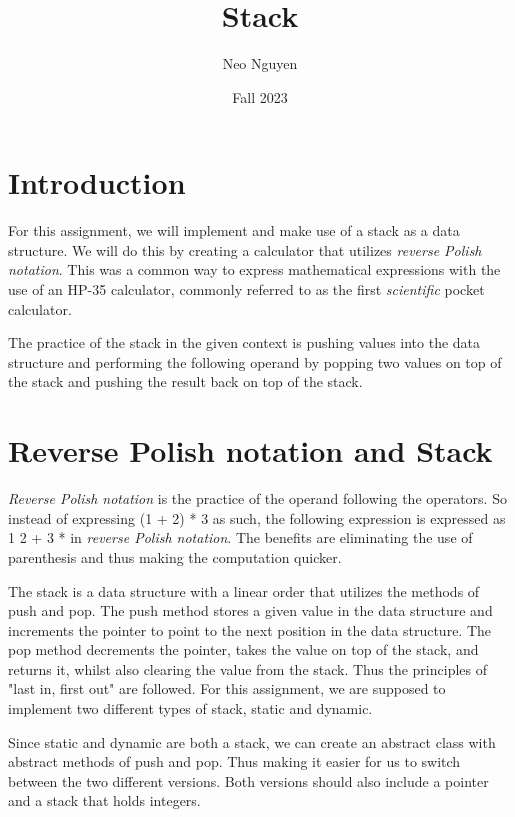 \documentclass[a4paper,11pt]{article}
\begin{document}
\title{
    \textbf{Stack}
}
\author{Neo Nguyen}
\date{Fall 2023}

\maketitle

\section*{Introduction}

    For this assignment, we will implement and make use of a stack as a data structure. We will do this by creating a calculator that utilizes \textit{reverse Polish notation}. This was a common way to express mathematical expressions with the use of an HP-35 calculator, commonly referred to as the first \textit{scientific} pocket calculator.

    The practice of the stack in the given context is pushing values into the data structure and performing the following operand by popping two values on top of the stack and pushing the result back on top of the stack.

\section*{Reverse Polish notation and Stack}

    \textit{Reverse Polish notation} is the practice of the operand following the operators. So instead of expressing (1 + 2) * 3 as such, the following expression is expressed as 1 2 + 3 * in \textit{reverse Polish notation}. The benefits are eliminating the use of parenthesis and thus making the computation quicker.

    The stack is a data structure with a linear order that utilizes the methods of push and pop. The push method stores a given value in the data structure and increments the pointer to point to the next position in the data structure. The pop method decrements the pointer, takes the value on top of the stack, and returns it, whilst also clearing the value from the stack. Thus the principles of "last in, first out" are followed. For this assignment, we are supposed to implement two different types of stack, static and dynamic.

    Since static and dynamic are both a stack, we can create an abstract class with abstract methods of push and pop. Thus making it easier for us to switch between the two different versions. Both versions should also include a pointer and a stack that holds integers.
\end{document}
